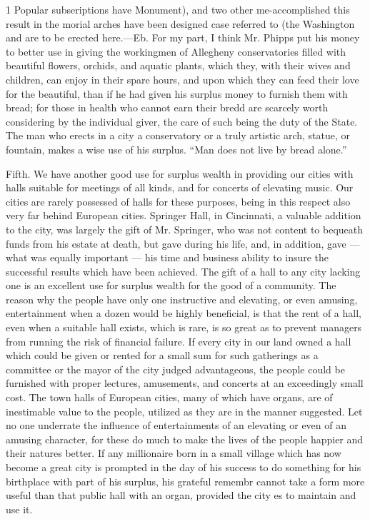 \documentclass[11pt,openany]{book}
\begin{document}
1 Popular subseriptions have Monument), and two other me-accomplished this result in the morial arches have been designed case referred to (the Washington and are to be erected here.---Eb. For my part, I think Mr. Phipps put his money to better use in giving the workingmen of Allegheny conservatories filled with beautiful flowers, orchids, and aquatic plants, which they, with their wives and children, can enjoy in their spare hours, and upon which they can feed their love for the beautiful, than if he had given his surplus money to furnish them with bread; for those in health who cannot earn their bredd are scarcely worth considering by the individual giver, the care of such being the duty of the State. The man who erects in a city a conservatory or a truly artistic arch, statue, or fountain, makes a wise use of his surplus. ``Man does not live by bread alone.''

Fifth. We have another good use for surplus wealth in providing our cities with halls suitable for meetings of all kinds, and for concerts of elevating music. Our cities are rarely possessed of halls for these purposes, being in this respect also very far behind European cities. Springer Hall, in Cincinnati, a valuable addition to the city, was largely the gift of Mr. Springer, who was not content to bequeath funds from his estate at death, but gave during his life, and, in addition, gave --- what was equally important --- his time and business ability to insure the successful results which have been achieved. The gift of a hall to any city lacking one is an excellent use for surplus wealth for the good of a community. The reason why the people have only one instructive and elevating, or even amusing, entertainment when a dozen would be highly beneficial, is that the rent of a hall, even when a suitable hall exists, which is rare, is so great as to prevent managers from running the risk of financial failure. If every city in our land owned a hall which could be given or rented for a small sum for such gatherings as a committee or the mayor of the city judged advantageous, the people could be furnished with proper lectures, amusements, and concerts at an exceedingly small cost. The town halls of European cities, many of which have organs, are of inestimable value to the people, utilized as they are in the manner suggested. Let no one underrate the influence of entertainments of an elevating or even of an amusing character, for these do much to make the lives of the people happier and their natures better. If any millionaire born in a small village which has now become a great city is prompted in the day of his success to do something for his birthplace with part of his surplus, his grateful remembr cannot take a form more useful than that public hall with an organ, provided the city es to maintain and use it.
\end{document}
